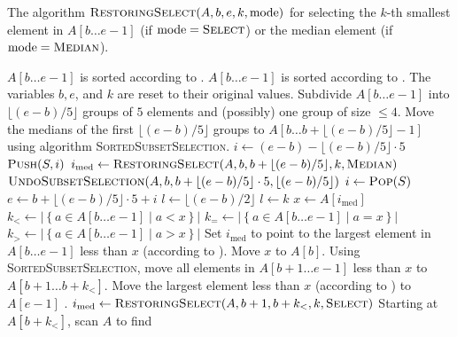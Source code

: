 \begin{algorithm}
  \caption{The algorithm
    $\textsc{RestoringSelect}({A},b,e,k,\text{mode})$ for
    selecting the $k$-th smallest element in ${A}[b\ldots
    e-1]$ (if $\text{mode}=\textsc{Select}$) or the median element (if
    $\text{mode}=\textsc{Median}$).}
  \begin{algorithmic}[1]
    \REQUIRE ${A}[b\ldots e-1]$ is sorted according to
    \LA. 
    \ENSURE ${A}[b\ldots e-1]$ is sorted according to
    \LA. The variables $b,e$, and $k$ are reset to their
    original values. 
    \STATE Subdivide ${A}[b\ldots e-1]$ into $\lfloor(e-b)/5
    \rfloor$ groups of $5$ elements and (possibly) one group of size 
    $\leq 4$.  
    \STATE Move the medians of the first $\lfloor(e-b)/5 \rfloor$ 
    groups to ${A}[b\ldots b+\lfloor(e-b)/5\rfloor-1]$ using 
    algorithm \textsc{SortedSubsetSelection}.  
    \STATE $i \leftarrow (e-b) - \lfloor(e-b)/5\rfloor\cdot 5$
    \STATE $\textsc{Push}(S,i)$ \setcounter{StackA}{\value{ALC@line}}
    \STATE
    $i_{\mathrm{med}} \leftarrow 
       \textsc{RestoringSelect}({A},b,b+\lfloor(e-b)/5\rfloor,k,\textsc{Median})$
    \setcounter{SelectA}{\value{ALC@line}}
    \STATE
    $\textsc{UndoSubsetSelection}({A},b,b+\lfloor(e-b)/5\rfloor\cdot 5, \lfloor(e-b)/5\rfloor)$
    \STATE $i \leftarrow \textsc{Pop}(S)$ \setcounter{StackB}{\value{ALC@line}}
    \STATE $e \leftarrow b + \lfloor(e-b)/5\rfloor \cdot 5 + i$
      \STATE $l \leftarrow \lfloor (e-b)/2 \rfloor$
    \ELSE
      \STATE $l \leftarrow k$
    \ENDIF
    \STATE $x \leftarrow {A}[i_{\mathrm{med}}]$
    \STATE 
     $k_< \leftarrow |\left\{a\in{A}[b\ldots e-1] \mid a<x\right\}|$
    \STATE 
     $k_= \leftarrow |\left\{a\in{A}[b\ldots e-1] \mid a=x\right\}|$ 
    \STATE 
     $k_> \leftarrow |\left\{a\in{A}[b\ldots e-1] \mid a>x\right\}|$
          \STATE Set $i_{\mathrm{med}}$ to point to the largest element
          in ${A}[b\ldots e-1]$ less than $x$ (according to \LB).
        \ELSE
          \STATE Move $x$ to ${A}[b]$.
          \STATE Using \textsc{SortedSubsetSelection}, move all elements in
          ${A}[b+1\ldots e-1]$ less than $x$ to
          ${A}[b+1\ldots b+k_<]$.
          \STATE Move the largest element less than $x$ (according to
          \LB) to ${A}[e-1]$ .
          \STATE
          $i_{\mathrm{med}} \leftarrow 
            \textsc{RestoringSelect}({A},b+1,b+k_<,k,\textsc{Select})$
          \setcounter{SelectB}{\value{ALC@line}}
          \STATE Starting at ${A}[b+k_<]$, scan ${A}$ to find

\end{algorithmic}
\end{algorithm}
